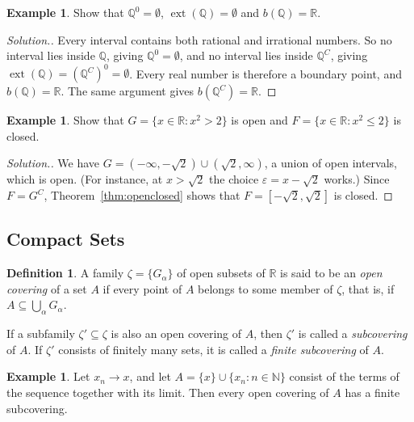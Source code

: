 \documentclass[11pt,a4paper]{article}
\numberwithin{equation}{section}
\theoremstyle{definition}
\newtheorem{defn}[thm]{Definition}
\newtheorem{exa}[thm]{Example}
\newenvironment{solution}
  {\renewcommand{\qedsymbol}{}\begin{proof}[\textit{Solution}.]}
  {\end{proof}}
\begin{document}
\begin{exa}
Show that $\mathbb{Q}^0 = \emptyset$, $\operatorname{ext}(\mathbb{Q}) = \emptyset$ and $b(\mathbb{Q}) = \mathbb{R}$.
\end{exa}

\begin{solution}
Every interval contains both rational and irrational numbers. So no interval lies inside $\mathbb{Q}$, giving $\mathbb{Q}^0 = \emptyset$, and no interval lies inside $\mathbb{Q}^C$, giving $\operatorname{ext}(\mathbb{Q}) = (\mathbb{Q}^C)^0 = \emptyset$. Every real number is therefore a boundary point, and $b(\mathbb{Q}) = \mathbb{R}$. The same argument gives $b(\mathbb{Q}^C) = \mathbb{R}$.
\end{solution}

\begin{exa}
Show that $G = \{x\in\mathbb{R}: x^2>2\}$ is open and $F = \{x\in\mathbb{R}: x^2\leq 2\}$ is closed.
\end{exa}

\begin{solution}
We have $G = (-\infty,-\sqrt{2})\cup(\sqrt{2},\infty)$, a union of open intervals, which is open. (For instance, at $x>\sqrt{2}$ the choice $\varepsilon = x-\sqrt{2}$ works.) Since $F = G^C$, Theorem~\ref{thm:openclosed} shows that $F = [-\sqrt{2},\sqrt{2}]$ is closed.
\end{solution}


\subsection{Compact Sets}

\begin{defn}
A family $\zeta = \{G_{\alpha}\}$ of open subsets of $\mathbb{R}$ is said to be an \emph{open covering} of a set $A$ if every point of $A$ belongs to some member of $\zeta$, that is, if $A\subseteq \bigcup_{\alpha}G_{\alpha}$.

If a subfamily $\zeta' \subseteq \zeta$ is also an open covering of $A$, then $\zeta'$ is called a \emph{subcovering} of $A$. If $\zeta'$ consists of finitely many sets, it is called a \emph{finite subcovering} of $A$.
\end{defn}


\begin{exa}
Let $x_n \longrightarrow x$, and let $A = \{x\} \cup \{x_n: n\in \mathbb{N}\}$ consist of the terms of the sequence together with its limit. Then every open covering of $A$ has a finite subcovering.
\end{exa}
\end{document}
